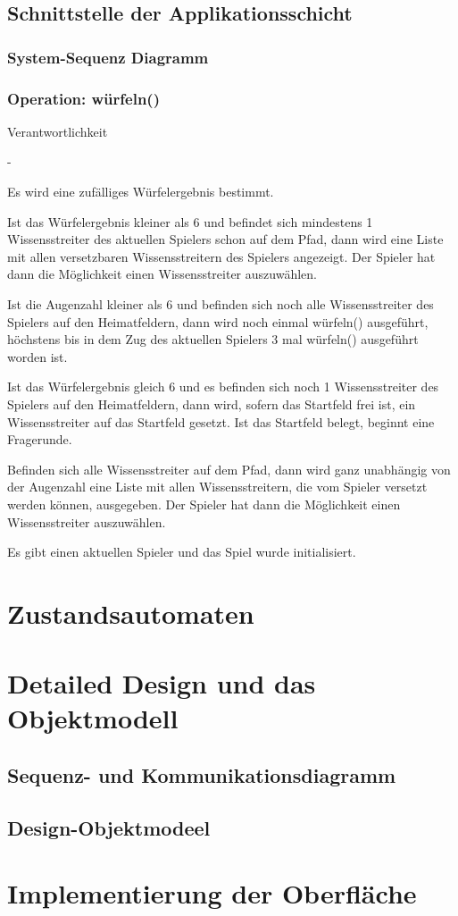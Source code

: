 \subsection{Schnittstelle der Applikationsschicht}

\subsubsection{System-Sequenz Diagramm}

\subsubsection{Operation: würfeln()}
\begin{labeling}[:]{Verantwortlichkeit}
\item [Parameter] -
\item [Verantwortlichkeit] Es wird eine zufälliges Würfelergebnis bestimmt. 

Ist das Würfelergebnis kleiner als 6 und befindet sich mindestens 1 Wissensstreiter des aktuellen Spielers schon auf dem Pfad, dann wird eine Liste mit allen versetzbaren Wissensstreitern des Spielers angezeigt. Der Spieler hat dann die Möglichkeit einen Wissensstreiter auszuwählen.

Ist die Augenzahl kleiner als 6 und befinden sich noch alle Wissensstreiter des Spielers auf den Heimatfeldern, dann  wird noch einmal würfeln() ausgeführt, höchstens bis in dem Zug des aktuellen Spielers 3 mal würfeln() ausgeführt worden ist.

Ist das Würfelergebnis gleich 6 und es befinden sich noch 1 Wissensstreiter des Spielers auf den Heimatfeldern, dann wird, sofern das Startfeld frei ist, ein Wissensstreiter auf das Startfeld gesetzt. Ist das Startfeld belegt, beginnt eine Fragerunde.

Befinden sich alle Wissensstreiter auf dem Pfad, dann wird ganz unabhängig von der Augenzahl eine Liste mit allen Wissensstreitern, die vom Spieler versetzt werden können, ausgegeben.
Der Spieler hat dann die Möglichkeit einen Wissensstreiter auszuwählen.
\item [Ausnahmen]
\item [Vorbedingungen] Es gibt einen aktuellen Spieler und das Spiel wurde initialisiert.
\item [Nachbedingungen]
\end{labeling}

\section{Zustandsautomaten}

\section{Detailed Design und das Objektmodell}

\subsection{Sequenz- und Kommunikationsdiagramm}

\subsection{Design-Objektmodeel}

\section{Implementierung der Oberfläche}
